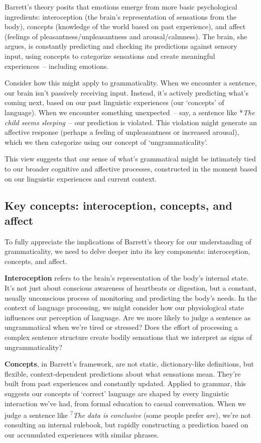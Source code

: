Barrett's theory posits that emotions emerge from more basic psychological ingredients: interoception (the brain's representation of sensations from the body), concepts (knowledge of the world based on past experience), and affect (feelings of pleasantness/unpleasantness and arousal/calmness). The brain, she argues, is constantly predicting and checking its predictions against sensory input, using concepts to categorize sensations and create meaningful experiences~-- including emotions.

Consider how this might apply to grammaticality. When we encounter a sentence, our brain isn't passively receiving input. Instead, it's actively predicting what's coming next, based on our past linguistic experiences (our `concepts' of language). When we encounter something unexpected~-- say, a sentence like *\textit{The child seems sleeping}~-- our prediction is violated. This violation might generate an affective response (perhaps a feeling of unpleasantness or increased arousal), which we then categorize using our concept of `ungrammaticality'.

This view suggests that our sense of what's grammatical might be intimately tied to our broader cognitive and affective processes, constructed in the moment based on our linguistic experiences and current context.

\subsection{Key concepts: interoception, concepts, and affect}

To fully appreciate the implications of Barrett's theory for our understanding of grammaticality, we need to delve deeper into its key components: interoception, concepts, and affect.

\textbf{Interoception} refers to the brain's representation of the body's internal state. It's not just about conscious awareness of heartbeats or digestion, but a constant, usually unconscious process of monitoring and predicting the body's needs. In the context of language processing, we might consider how our physiological state influences our perception of language. Are we more likely to judge a sentence as ungrammatical when we're tired or stressed? Does the effort of processing a complex sentence structure create bodily sensations that we interpret as signs of ungrammaticality?

\textbf{Concepts}, in Barrett's framework, are not static, dictionary-like definitions, but flexible, context-dependent predictions about what sensations mean. They're built from past experiences and constantly updated. Applied to grammar, this suggests our concepts of `correct' language are shaped by every linguistic interaction we've had, from formal education to casual conversation. When we judge a sentence like \textsuperscript{?}{\textit{The data is conclusive}} (some people prefer \textit{are}), we're not consulting an internal rulebook, but rapidly constructing a prediction based on our accumulated experiences with similar phrases.

